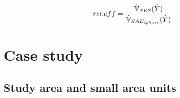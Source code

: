 \begin{equation}\label{eq:releff}
rel.eff=\frac{\hat{\mathbb{V}}_{SRS}(\hat{Y})}{\hat{\mathbb{V}}_{SAE_{2phase}}(\hat{Y})}
\end{equation}

\newpage



\section{Case study}
\label{sec:CaseStudy}


\subsection{Study area and small area units}
\label{sec:studyarea}


